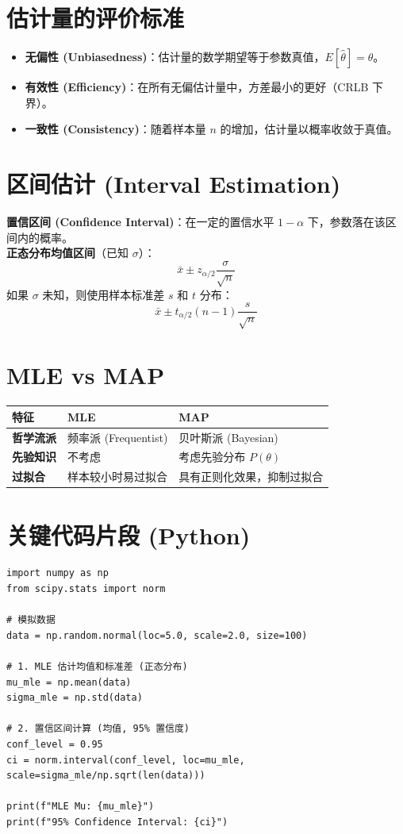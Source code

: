 \documentclass[12pt, a4paper]{article}
\begin{document}
\section{估计量的评价标准}

\begin{itemize}
    \item \textbf{无偏性 (Unbiasedness)}：估计量的数学期望等于参数真值，$E[\hat{\theta}] = \theta$。
    \item \textbf{有效性 (Efficiency)}：在所有无偏估计量中，方差最小的更好（CRLB 下界）。
    \item \textbf{一致性 (Consistency)}：随着样本量 $n$ 的增加，估计量以概率收敛于真值。
\end{itemize}

\section{区间估计 (Interval Estimation)}
\textbf{置信区间 (Confidence Interval)}：在一定的置信水平 $1-\alpha$ 下，参数落在该区间内的概率。
\\ \textbf{正态分布均值区间}（已知 $\sigma$）：
$$ \bar{x} \pm z_{\alpha/2} \frac{\sigma}{\sqrt{n}} $$
如果 $\sigma$ 未知，则使用样本标准差 $s$ 和 $t$ 分布：
$$ \bar{x} \pm t_{\alpha/2}(n-1) \frac{s}{\sqrt{n}} $$

\section{MLE vs MAP}
\begin{table}[h]
\centering
\begin{tabularx}{\textwidth}{|l|X|X|}
\hline
\textbf{特征} & \textbf{MLE} & \textbf{MAP} \\
\hline
\textbf{哲学流派} & 频率派 (Frequentist) & 贝叶斯派 (Bayesian) \\
\hline
\textbf{先验知识} & 不考虑 & 考虑先验分布 $P(\theta)$ \\
\hline
\textbf{过拟合} & 样本较小时易过拟合 & 具有正则化效果，抑制过拟合 \\
\hline
\end{tabularx}
\end{table}

\section{关键代码片段 (Python)}
\begin{lstlisting}
import numpy as np
from scipy.stats import norm

# 模拟数据
data = np.random.normal(loc=5.0, scale=2.0, size=100)

# 1. MLE 估计均值和标准差 (正态分布)
mu_mle = np.mean(data)
sigma_mle = np.std(data)

# 2. 置信区间计算 (均值, 95% 置信度)
conf_level = 0.95
ci = norm.interval(conf_level, loc=mu_mle, scale=sigma_mle/np.sqrt(len(data)))

print(f"MLE Mu: {mu_mle}")
print(f"95% Confidence Interval: {ci}")
\end{lstlisting}
\end{document}
